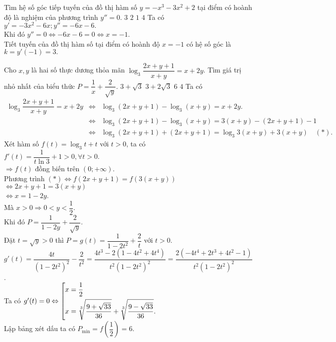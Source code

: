 \begin{ex}%
	Tìm hệ số góc tiếp tuyến của đồ thị hàm số $y=-x^3-3x^2+2$ tại điểm có hoành độ là nghiệm của phương trình $y''=0$.
	\choice
	{\True $3$}
	{$2$}
	{$1$}
	{$4$}
	\loigiai
	{Ta có ${y}'=-3x^2-6x; {y}''=-6x-6.$\\
		Khi đó $y''=0 \Leftrightarrow-6x-6=0 \Leftrightarrow x=-1.$\\
		Tiết tuyến của đồ thị hàm số tại điểm có hoành độ $x=-1$ có hệ số góc là $k=y'(-1)=3.$
	}
\end{ex}

\begin{ex}%
	Cho $x,y$ là hai số thực dương thỏa mãn $\log_3{\dfrac{2x+y+1}{x+y}}=x+2y$. Tìm giá trị nhỏ nhất của biểu thức $P=\dfrac{1}{x}+\dfrac{2}{\sqrt{y}}$.
	\choice
	{$3+\sqrt{3}$}
	{$3+2\sqrt{3}$}
	{\True $6$}
	{$4$}
	\loigiai
	{
		Ta có 
		\begin{eqnarray*}
		\log_3{\dfrac{2x+y+1}{x+y}}=x+2y &\Leftrightarrow &{{\log }_{3}}\left( 2x+y+1 \right)-{{\log }_{3}}\left( x+y \right)=x+2y.\\
		&\Leftrightarrow &{{\log }_{3}}\left( 2x+y+1 \right) -\log_3{(x+y)}=3(x+y)-(2x+y+1)-1\\
		&\Leftrightarrow &\log_3{(2x+y+1)} + (2x+y+1)=\log_3{3(x+y)}+3(x+y) \quad (*).
		\end{eqnarray*}
		Xét hàm số $f(t)=\log_3{t}+t$ với $t>0$, ta có\\
		$f'(t)=\dfrac{1}{t\ln{3}}+1>0,  \forall t>0$.\\
		$\Rightarrow f(t)$ đồng biến trên $(0;+\infty).$\\
		Phương trình $(*)\Leftrightarrow f(2x+y+1)=f(3(x+y))$ \\
		$\Leftrightarrow 2x+y+1=3(x+y)$\\
		$\Leftrightarrow x=1-2y$.\\
		Mà $x>0\Rightarrow 0<y<\dfrac{1}{2}$.\\
		Khi đó $P=\dfrac{1}{1-2y}+\dfrac{2}{\sqrt{y}}$.\\
		Đặt $t=\sqrt{y}>0$ thì $P=g(t)=\dfrac{1}{1-2t^2}+\dfrac{2}{t}$ với $t>0.$\\
		$g'(t)=\dfrac{4t}{\left(1-2t^2\right)^2}-\dfrac{2}{t^2}=\dfrac{4t^3-2(1-4t^2+4t^4)}{t^2\left(1-2t^2\right)^2}=\dfrac{2(-4t^4+2t^3+4t^2-1)}{t^2\left(1-2t^2\right)^2}$.\\
		Ta có $g'(t) = 0 \Leftrightarrow \left[\begin{aligned}&x=\dfrac{1}{2}\\&x=\sqrt[3]{\dfrac{9+\sqrt{33}}{36}} + \sqrt[3]{\dfrac{9-\sqrt{33}}{36}}.\end{aligned}\right.$\\
		Lập bảng xét dấu ta có ${{P}_{\min }}=f\left( \dfrac{1}{2} \right)=6$. 
	}
\end{ex}

